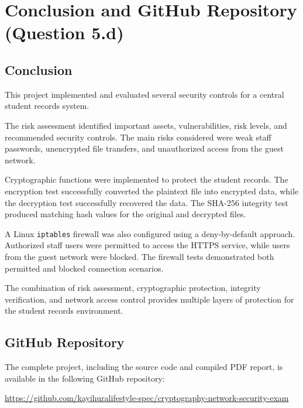 \documentclass[12pt,a4paper]{article}
\begin{document}

\newpage

\section{Conclusion and GitHub Repository (Question 5.d)}

\subsection{Conclusion}

This project implemented and evaluated several security controls for a central student records system.

The risk assessment identified important assets, vulnerabilities, risk levels, and recommended security controls. The main risks considered were weak staff passwords, unencrypted file transfers, and unauthorized access from the guest network.

Cryptographic functions were implemented to protect the student records. The encryption test successfully converted the plaintext file into encrypted data, while the decryption test successfully recovered the data. The SHA-256 integrity test produced matching hash values for the original and decrypted files.

A Linux \texttt{iptables} firewall was also configured using a deny-by-default approach. Authorized staff users were permitted to access the HTTPS service, while users from the guest network were blocked. The firewall tests demonstrated both permitted and blocked connection scenarios.

The combination of risk assessment, cryptographic protection, integrity verification, and network access control provides multiple layers of protection for the student records environment.

\subsection{GitHub Repository}

The complete project, including the source code and compiled PDF report, is available in the following GitHub repository:

\begin{center}
\url{https://github.com/kayihuralifestyle-spec/cryptography-network-security-exam}
\end{center}

\end{document}
